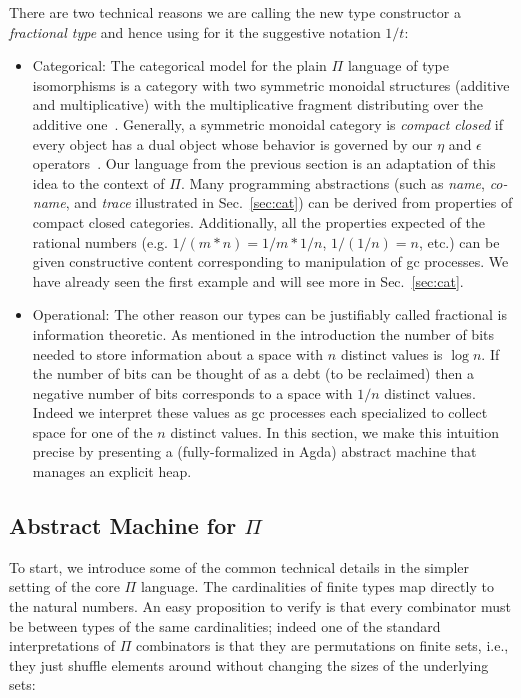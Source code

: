 \documentclass[sigplan,10pt,review,anonymous]{acmart}
\newcommand{\oneover}[1]{1/#1}
\begin{document}
There are two technical reasons we are calling the new type constructor a
\emph{fractional type} and hence using for it the suggestive notation
$\oneover{t}$:
\begin{itemize}
\item Categorical: The categorical model for the plain $\Pi$ language
  of type isomorphisms is a category with two symmetric monoidal
  structures (additive and multiplicative) with the multiplicative fragment
  distributing over the additive one~\cite{DBLP:conf/esop/CaretteS16}. Generally,
  a symmetric monoidal category is \emph{compact closed} if every
  object has a dual object whose behavior is governed by our $\eta$
  and $\epsilon$ operators~\cite{kelly1972many}. Our language from the previous
  section is an adaptation of this idea to the context of $\Pi$. Many
  programming abstractions (such as \emph{name}, \emph{co-name}, and
  \emph{trace} illustrated in Sec.~\ref{sec:cat}) can be
  derived from properties of compact closed categories. Additionally,
  all the properties expected of the rational numbers
  (e.g. $\oneover{(m*n)} = \oneover{m}*\oneover{n}$,
  $\oneover{(\oneover{n})}=n$, etc.) can be given constructive content
  corresponding to manipulation of gc processes. We have already seen
  the first example and will see more in Sec.~\ref{sec:cat}.

\item Operational: The other reason our types can be justifiably
  called fractional is information theoretic. As mentioned in the
  introduction the number of bits needed to store information about a
  space with $n$ distinct values is $\log{n}$. If the number of bits
  can be thought of as a debt (to be reclaimed) then a negative number
  of bits corresponds to a space with $\oneover{n}$ distinct
  values. Indeed we interpret these values as gc processes each
  specialized to collect space for one of the $n$ distinct values. In
  this section, we make this intuition precise by presenting a
  (fully-formalized in Agda) abstract machine that manages an explicit
  heap.
\end{itemize}

\subsection{Abstract Machine for $\Pi$}

To start, we introduce some of the common technical details in the
simpler setting of the core $\Pi$ language. The cardinalities of
finite types map directly to the natural numbers. An easy proposition
to verify is that every combinator must be between types of the same
cardinalities; indeed one of the standard interpretations of $\Pi$
combinators is that they are permutations on finite sets, i.e., they
just shuffle elements around without changing the sizes of the
underlying sets:
\end{document}
